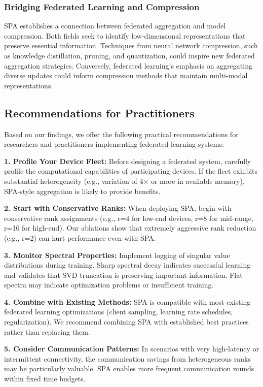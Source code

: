 \documentclass[conference]{IEEEtran}
\begin{document}
\subsubsection{Bridging Federated Learning and Compression}

SPA establishes a connection between federated aggregation and model compression. Both fields seek to identify low-dimensional representations that preserve essential information. Techniques from neural network compression, such as knowledge distillation, pruning, and quantization, could inspire new federated aggregation strategies. Conversely, federated learning's emphasis on aggregating diverse updates could inform compression methods that maintain multi-modal representations.

\subsection{Recommendations for Practitioners}

Based on our findings, we offer the following practical recommendations for researchers and practitioners implementing federated learning systems:

\textbf{1. Profile Your Device Fleet:} Before designing a federated system, carefully profile the computational capabilities of participating devices. If the fleet exhibits substantial heterogeneity (e.g., variation of 4× or more in available memory), SPA-style aggregation is likely to provide benefits.

\textbf{2. Start with Conservative Ranks:} When deploying SPA, begin with conservative rank assignments (e.g., r=4 for low-end devices, r=8 for mid-range, r=16 for high-end). Our ablations show that extremely aggressive rank reduction (e.g., r=2) can hurt performance even with SPA.

\textbf{3. Monitor Spectral Properties:} Implement logging of singular value distributions during training. Sharp spectral decay indicates successful learning and validates that SVD truncation is preserving important information. Flat spectra may indicate optimization problems or insufficient training.

\textbf{4. Combine with Existing Methods:} SPA is compatible with most existing federated learning optimizations (client sampling, learning rate schedules, regularization). We recommend combining SPA with established best practices rather than replacing them.

\textbf{5. Consider Communication Patterns:} In scenarios with very high-latency or intermittent connectivity, the communication savings from heterogeneous ranks may be particularly valuable. SPA enables more frequent communication rounds within fixed time budgets.
\end{document}
